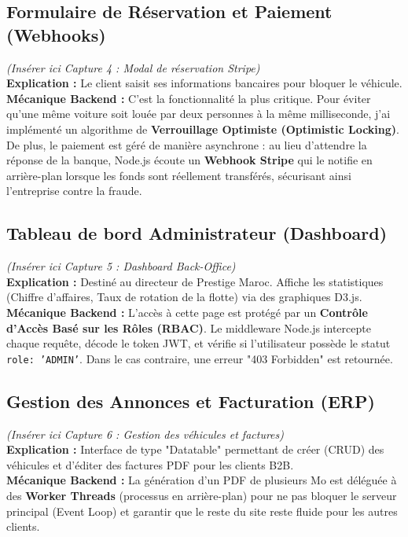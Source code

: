 \documentclass[12pt, a4paper]{report}
\begin{document}
\subsection{Formulaire de Réservation et Paiement (Webhooks)}
\textit{(Insérer ici Capture 4 : Modal de réservation Stripe)} \\
\textbf{Explication :} Le client saisit ses informations bancaires pour bloquer le véhicule. \\
\textbf{Mécanique Backend :} C'est la fonctionnalité la plus critique. Pour éviter qu'une même voiture soit louée par deux personnes à la même milliseconde, j'ai implémenté un algorithme de \textbf{Verrouillage Optimiste (Optimistic Locking)}. De plus, le paiement est géré de manière asynchrone : au lieu d'attendre la réponse de la banque, Node.js écoute un \textbf{Webhook Stripe} qui le notifie en arrière-plan lorsque les fonds sont réellement transférés, sécurisant ainsi l'entreprise contre la fraude.

\subsection{Tableau de bord Administrateur (Dashboard)}
\textit{(Insérer ici Capture 5 : Dashboard Back-Office)} \\
\textbf{Explication :} Destiné au directeur de Prestige Maroc. Affiche les statistiques (Chiffre d'affaires, Taux de rotation de la flotte) via des graphiques D3.js. \\
\textbf{Mécanique Backend :} L'accès à cette page est protégé par un \textbf{Contrôle d'Accès Basé sur les Rôles (RBAC)}. Le middleware Node.js intercepte chaque requête, décode le token JWT, et vérifie si l'utilisateur possède le statut \texttt{role: 'ADMIN'}. Dans le cas contraire, une erreur "403 Forbidden" est retournée.

\subsection{Gestion des Annonces et Facturation (ERP)}
\textit{(Insérer ici Capture 6 : Gestion des véhicules et factures)} \\
\textbf{Explication :} Interface de type "Datatable" permettant de créer (CRUD) des véhicules et d'éditer des factures PDF pour les clients B2B. \\
\textbf{Mécanique Backend :} La génération d'un PDF de plusieurs Mo est déléguée à des \textbf{Worker Threads} (processus en arrière-plan) pour ne pas bloquer le serveur principal (Event Loop) et garantir que le reste du site reste fluide pour les autres clients.
\end{document}
